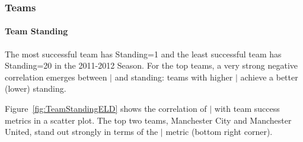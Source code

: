 		
			
			\begin{table}
				\caption{Correlation between $\mid$ metric and standing of Teams. The best standing is place 1. \label{table:teamELD}}
				\centering
			\end{table}
			
			
			\begin{table}
				\caption{Correlation between $\mid$ metric and success metrics of Players.}
				\label{table:ELDwithPlayer}
				\centering
					
				\end{table}
		
		
		\subsubsection{Teams} 
		\paragraph{Team Standing}
		The most successful team has Standing=1 and the least successful team has Standing=20 in the 2011-2012 Season. For the top teams, a very strong negative correlation emerges between $\mid$ and standing: teams with higher $\mid$ achieve a better (lower) standing. 
		
		Figure~\ref{fig:TeamStandingELD} shows the correlation of $\mid$ with team success metrics in a scatter plot. The top two teams, Manchester City and Manchester United, stand out strongly in terms of the $\mid$ metric (bottom right corner).
		
